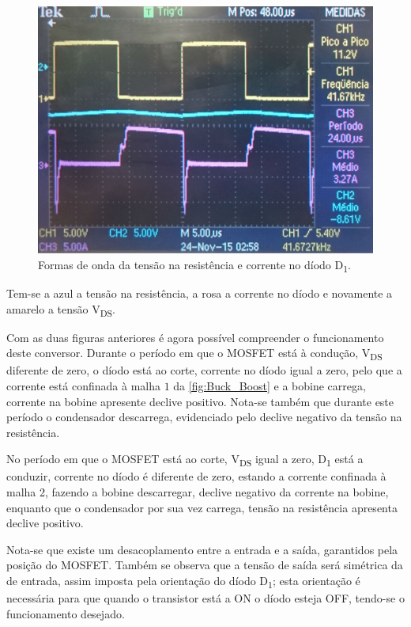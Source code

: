 \documentclass[a4paper,11pt]{article}
\numberwithin{equation}{section}
\begin{document}
\begin{figure}[H]
	\centering
	\includegraphics[keepaspectratio=true, scale=0.14]{img/figs/tensao_resistencia_corrente_d1_buck_boost}
	\caption{Formas de onda da tensão na resistência e corrente no díodo D\textsubscript{1}.}
	\label{fig:tensao_resistencia_corrente_d1_buck_boost}
	\vspace{-0.8em}
\end{figure}

Tem-se a azul a tensão na resistência, a rosa a corrente no díodo e novamente a amarelo a tensão V\textsubscript{DS}.

Com as duas figuras anteriores é agora possível compreender o funcionamento deste conversor. Durante o período em que o MOSFET está à condução, V\textsubscript{DS} diferente de zero, o díodo está ao corte, corrente no díodo igual a zero, pelo que a corrente está confinada à malha $1$ da \autoref{fig:Buck_Boost} e a bobine carrega, corrente na bobine apresente declive positivo. Nota-se também que durante este período o condensador descarrega, evidenciado pelo declive negativo da tensão na resistência.

No período em que o MOSFET está ao corte, V\textsubscript{DS} igual a zero, D\textsubscript{1} está a conduzir, corrente no díodo é diferente de zero, estando a corrente confinada à malha 2, fazendo a bobine descarregar, declive negativo da corrente na bobine, enquanto que o condensador por sua vez carrega, tensão na resistência apresenta declive positivo.

Nota-se que existe um desacoplamento entre a entrada e a saída, garantidos pela posição do MOSFET. Também se observa que a tensão de saída será simétrica da de entrada, assim imposta pela orientação do díodo D\textsubscript{1}; esta orientação é necessária para que quando o transistor está a ON o díodo esteja OFF, tendo-se o funcionamento desejado.
\end{document}
